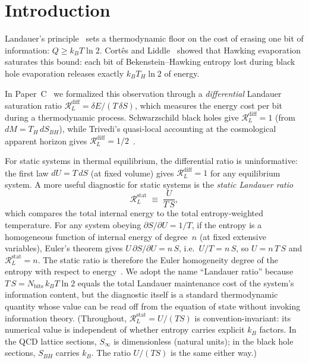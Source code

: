 \documentclass[%
 aip,
 amsmath,amssymb,
 reprint,%
]{revtex4-2}
\newcommand{\RLs}{\mathcal{R}_L^{\mathrm{stat}}}
\begin{document}
\maketitle

\section{Introduction}

Landauer's principle~\cite{Landauer1961} sets a thermodynamic floor
on the cost of erasing one bit of information: $Q \geq k_B T \ln 2$.
Cort\^es and Liddle~\cite{Cortes2024} showed that Hawking evaporation
saturates this bound: each bit of Bekenstein--Hawking entropy lost
during black hole evaporation releases exactly $k_B T_H \ln 2$ of
energy.

In Paper~C~\cite{Rahnama2026BlackHole} we formalized this observation
through a \emph{differential} Landauer saturation ratio
$\mathcal{R}_L^{\mathrm{diff}} = \delta E / (T\,\delta S)$, which
measures the energy cost per bit during a thermodynamic process.
Schwarzschild black holes give
$\mathcal{R}_L^{\mathrm{diff}} = 1$ (from $dM = T_H\,dS_{BH}$),
while Trivedi's quasi-local accounting at the cosmological apparent
horizon gives
$\mathcal{R}_L^{\mathrm{diff}} = 1/2$~\cite{Trivedi2024}.

For static systems in thermal equilibrium, the differential ratio
is uninformative: the first law $dU = T\,dS$ (at fixed volume)
gives $\mathcal{R}_L^{\mathrm{diff}} = 1$ for any equilibrium
system.  A more useful diagnostic for static systems is the
\emph{static Landauer ratio}
\begin{equation}
\RLs \;\equiv\; \frac{U}{T\,S},
\end{equation}
which compares the total internal energy to the total
entropy-weighted temperature.  For any system obeying
$\partial S/\partial U = 1/T$, if the entropy is a homogeneous
function of internal energy of degree~$n$ (at fixed extensive
variables), Euler's theorem gives $U\,\partial S/\partial U = n\,S$,
i.e.\ $U/T = n\,S$, so $U = n\,T\,S$ and
$\mathcal{R}_L^{\mathrm{stat}} = n$.  The static ratio is therefore
the Euler homogeneity degree of the entropy with respect to
energy~\cite{Callen1985,KastorRayTraschen2009}.  We adopt the name
``Landauer ratio''
because $T\,S = N_{\mathrm{bits}}\,k_B T \ln 2$ equals the total
Landauer maintenance cost of the system's information content, but
the diagnostic itself is a standard thermodynamic quantity whose
value can be read off from the equation of state without invoking
information theory.  (Throughout, $\RLs = U/(TS)$ is
convention-invariant: its numerical value is independent of whether
entropy carries explicit $k_B$ factors.  In the QCD lattice
sections, $S_\infty$ is dimensionless (natural units); in the
black hole sections, $S_{BH}$ carries $k_B$.  The ratio $U/(TS)$
is the same either way.)
\end{document}
